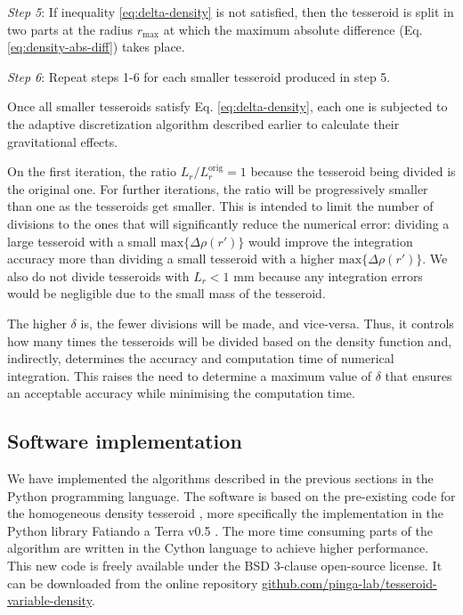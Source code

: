 \documentclass[extra, referee]{gji}
\begin{document}
\textit{Step 5}:
If inequality \ref{eq:delta-density} is not satisfied, then the tesseroid is split in
two parts at the radius $r_\text{max}$ at which the maximum absolute difference (Eq.
\ref{eq:density-abs-diff}) takes place.

\textit{Step 6}:
Repeat steps 1-6 for each smaller tesseroid produced in step 5.

Once all smaller tesseroids satisfy Eq. \ref{eq:delta-density},
each one is subjected to the adaptive
discretization algorithm described earlier to calculate their gravitational effects.

On the first iteration, the ratio $L_r/L_r^\text{orig} = 1$ because the tesseroid being
divided is the original one.
For further iterations, the ratio will be progressively smaller than one as the
tesseroids get smaller.
This is intended to limit the number of divisions to the ones that will
significantly reduce the numerical error:
dividing a large tesseroid with a small $\text{max}\{ \Delta \rho(r') \}$ would
improve the integration accuracy more than dividing a small tesseroid with a
higher $\text{max}\{ \Delta \rho(r') \}$.
We also do not divide tesseroids with $L_r < 1$ mm because any integration errors would
be negligible due to the small mass of the tesseroid.

The higher $\delta$ is, the fewer divisions will be made, and vice-versa.
Thus, it controls how many times the tesseroids will be divided based on the density
function and, indirectly, determines the accuracy and computation time of
numerical integration.
This raises the need to determine a maximum value of $\delta$ that
ensures an acceptable accuracy while minimising the computation time.


\subsection{Software implementation}

We have implemented the algorithms described in the previous sections in the Python
programming language.
The software is based on the pre-existing code for the homogeneous density tesseroid
\citep{Uieda2016}, more specifically the implementation in the Python library Fatiando a
Terra v0.5 \citep{Uieda2013}.
The more time consuming parts of the algorithm are written in the Cython language to
achieve higher performance.
This new code is freely available under the BSD 3-clause open-source license.
It can be downloaded from the online repository
\href{https://github.com/pinga-lab/tesseroid-variable-density}{github.com/pinga-lab/tesseroid-variable-density}.
\end{document}
